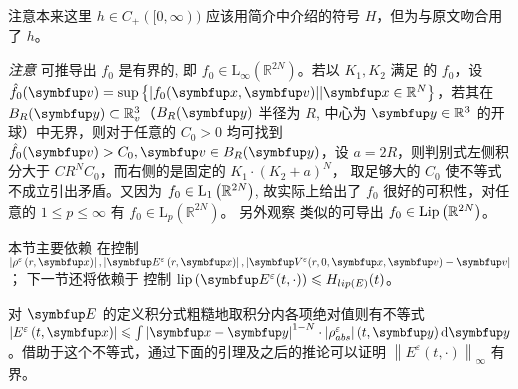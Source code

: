注意本来这里 $h\in C_+([0,\infty))$ 应该用简介中介绍的符号 $H$，但为与原文吻合用了 $h$。

\textit{注意 } \supremumf 可推导出 $f_0$ 是有界的, 即 $f_0 \in \mathrm{L}_{\infty}\left(\mathbb{R}^{2 N}\right)$。若以 $K_1, K_2$ 满足 \supremumf 的 $f_0$，设 $\hat{f}_0 (\vv)=\sup \left\{|f_0(\vx,\vect{v})| |\vx \in \bbR^{N}\right\}$，若其在 $B_R(\vy)\subset \bbR_{v}^3 $（$B_R(\vy)$ 半径为 $R$, 中心为 $\vy\in \bbR^3$ 的开球）中无界，则对于任意的 $C_0>0$ 均可找到 $\hat{f}_0(\vv)>C_0, \vv \in B_R(\vy)$，设 $a=2R$，则\supremumf 判别式左侧积分大于 $CR^N C_0$，而右侧的是固定的 $K_{1} \cdot\left(K_{2}+a\right)^{N}$， 取足够大的 $C_0$ 使不等式不成立引出矛盾。又因为 $f_0 \in \mathrm{L}_{1}\left({\mathbb{R}}^{2 N}\right)$, 故\supremumf 实际上给出了 $f_0$ 很好的可积性，对任意的 $1 \leqslant p \leqslant \infty$ 有 $f_0 \in \mathrm{L}_{p}\left(\mathbb{R}^{2 N}\right)$。
另外观察 \lipOffVsphere 类似的可导出 $f_{0} \in \operatorname{Lip}\left({\mathbb{R}}^{2 N}\right)$。

本节主要依赖 \supremumf 在控制 $\left|\rho^{\varepsilon}\left(r, \vx\right)\right| , \left|\vE^{\varepsilon}\left(r, \vx\right)\right|, | \vect{V}^{\varepsilon}(r, 0, \vx, \vv)-\vv | $； 下一节还将依赖于 \lipOffVsphere 控制 $\operatorname{lip}\left(\vE^{\varepsilon}(t, \cdot)\right) \leqslant H_{lip(E)}(t)$。


对 $\vE$ 的定义积分式粗糙地取积分内各项绝对值则有不等式 $\left|E^{\varepsilon}\left(t, \vx \right)\right| \leqslant \int\left|\vx-\vy\right|^{1-N} \cdot\left|\rho^{\varepsilon}_{abs}\right|\left(t, \vy\right) \mathrm{d} \vy$。借助于这个不等式，通过下面的引理及之后的推论可以证明 $\left\|E^{\varepsilon}(t, \cdot)\right\|_{\infty}$ 有界。

